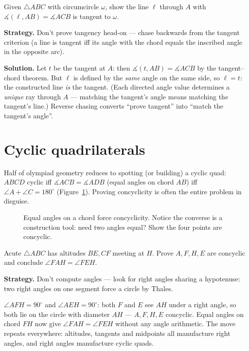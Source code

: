 \begin{example}
Given $\triangle ABC$ with circumcircle $\omega$, show the line $\ell$
through $A$ with $\measuredangle(\ell, AB) = \measuredangle ACB$ is
tangent to $\omega$.

\textbf{Strategy.} Don't prove tangency head-on --- chase backwards
from the tangent criterion (a line is tangent iff its angle with the
chord equals the inscribed angle in the opposite arc).

\textbf{Solution.} Let $t$ be the tangent at $A$: then
$\measuredangle(t,AB)=\measuredangle ACB$ by the tangent--chord
theorem. But $\ell$ is defined by the \emph{same} angle on the same
side, so $\ell=t$: the constructed line \emph{is} the tangent. (Each
directed angle value determines a \emph{unique} ray through $A$ ---
matching the tangent's angle means matching the tangent's line.)
Reverse chasing converts ``prove tangent'' into ``match the tangent's
angle''.
\end{example}

\section{Cyclic quadrilaterals}
Half of olympiad geometry reduces to spotting (or building) a cyclic
quad: $ABCD$ cyclic iff $\measuredangle ACB=\measuredangle ADB$ (equal
angles on chord $AB$) iff $\angle A+\angle C=180^\circ$
(Figure~\ref{fig:cyclic}). Proving concyclicity is often the entire
problem in disguise.
\begin{figure}[ht]\centering

\caption{Equal angles on a chord force concyclicity. Notice the converse
is a construction tool: need two angles equal? Show the four points are
concyclic.}
\label{fig:cyclic}
\end{figure}

\begin{example}
Acute $\triangle ABC$ has altitudes $BE, CF$ meeting at $H$. Prove
$A, F, H, E$ are concyclic and conclude $\angle FAH = \angle FEH$.
\par\smallskip
\textbf{Strategy.} Don't compute angles --- look for right angles
sharing a hypotenuse: two right angles on one segment force a circle
by Thales.
\par\smallskip
\begin{solution}
$\angle AFH = 90^\circ$ and $\angle AEH = 90^\circ$: both $F$ and $E$
see $AH$ under a right angle, so both lie on the circle with diameter
$AH$ --- $A,F,H,E$ concyclic. Equal angles on chord $FH$ now give
$\angle FAH = \angle FEH$ without any angle arithmetic. The move
repeats everywhere: altitudes, tangents and midpoints all manufacture
right angles, and right angles manufacture cyclic quads.
\end{solution}
\end{example}

